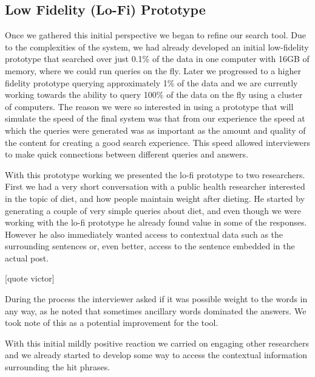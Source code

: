 \documentclass{sigchi}
\begin{document}
\subsection{Low Fidelity (Lo-Fi) Prototype}
Once we gathered this initial perspective we began to refine our search tool. Due to the complexities of the system, we had already developed an initial low-fidelity prototype that searched over just 0.1\% of the data in one computer with 16GB of memory, where we could run queries on the fly. Later we progressed to a higher fidelity prototype querying approximately 1\% of the data and we are currently working towards the ability to query 100\% of the data on the fly using a cluster of computers. The reason we were so interested in using a prototype that will simulate the speed of the final system was that from our experience the speed at which the queries were generated was as important as the amount and quality of the content for creating a good search experience. This speed allowed interviewers to make quick connections between different queries and answers.

With this prototype working we presented the lo-fi prototype to two researchers. First we had a very short conversation with a public health researcher interested in the topic of diet, and how people maintain weight after dieting. He started by generating a couple of very simple queries about diet, and even though we were working with the lo-fi prototype he already found value in some of the responses. However he also immediately wanted access to contextual data such as the surrounding sentences or, even better, access to the sentence embedded in the actual post. 

[quote victor]

During the process the interviewer asked if it was possible weight to the words in any way, as he noted that sometimes ancillary words dominated the answers. We took note of this as a potential improvement for the tool.

With this initial mildly positive reaction we carried on engaging other researchers and we already started to develop some way to access the contextual information surrounding the hit phrases. 

\end{document}
